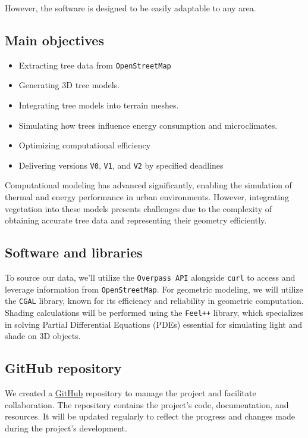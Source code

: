 \documentclass[12pt]{article}
\begin{document}
However, the software is designed to be easily adaptable to any area.



\newpage

\subsection{Main objectives}

\begin{itemize}
    \item Extracting tree data from \texttt{OpenStreetMap}
    \item Generating 3D tree models.
    \item Integrating tree models into terrain meshes.
    \item Simulating how trees influence energy consumption and microclimates.
    \item Optimizing computational efficiency
    \item Delivering versions \texttt{V0}, \texttt{V1}, and \texttt{V2} by specified deadlines
\end{itemize}


Computational modeling has advanced significantly, enabling the simulation of thermal
and energy performance in urban environments. However, integrating vegetation into
these models presents challenges due to the complexity of obtaining accurate tree data
and representing their geometry efficiently\cite{AdTree}.

\newpage

\subsection{Software and libraries}
To source our data, we'll utilize the \texttt{Overpass API} \cite{overpass} alongside
\texttt{curl} \cite{curl} to access and leverage information from \texttt{OpenStreetMap}.
For geometric modeling, we will utilize the \texttt{CGAL} library, known for its efficiency and
reliability in geometric computation\cite{cgal}. Shading calculations will be performed using the
\texttt{Feel++} \cite{feel++} library, which specializes in solving Partial Differential Equations (PDEs)
essential for simulating light and shade on 3D objects.

\subsection{GitHub repository}
We created a \href{https://github.com/master-csmi/2024-m1-vegetation}{GitHub} repository to manage the project and facilitate collaboration.
The repository contains the project's code, documentation, and resources. It will be
updated regularly to reflect the progress and changes made during the project's
development.
\end{document}
